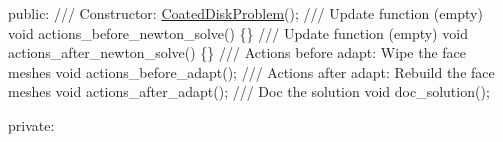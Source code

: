 \begin{DoxyCodeInclude}
\textcolor{keyword}{public}:
\textcolor{comment}{}
\textcolor{comment}{ /// Constructor:}
\textcolor{comment}{} \hyperlink{classCoatedDiskProblem}{CoatedDiskProblem}();
 \textcolor{comment}{}
\textcolor{comment}{ /// Update function (empty)}
\textcolor{comment}{} \textcolor{keywordtype}{void} actions\_before\_newton\_solve() \{\}
\textcolor{comment}{}
\textcolor{comment}{ /// Update function (empty)}
\textcolor{comment}{} \textcolor{keywordtype}{void} actions\_after\_newton\_solve() \{\}
 \textcolor{comment}{}
\textcolor{comment}{ /// Actions before adapt: Wipe the face meshes}
\textcolor{comment}{} \textcolor{keywordtype}{void} actions\_before\_adapt();
\textcolor{comment}{}
\textcolor{comment}{ /// Actions after adapt: Rebuild the face meshes}
\textcolor{comment}{} \textcolor{keywordtype}{void} actions\_after\_adapt();
\textcolor{comment}{}
\textcolor{comment}{ /// Doc the solution}
\textcolor{comment}{} \textcolor{keywordtype}{void} doc\_solution();

\textcolor{keyword}{private}:


\end{DoxyCodeInclude}
